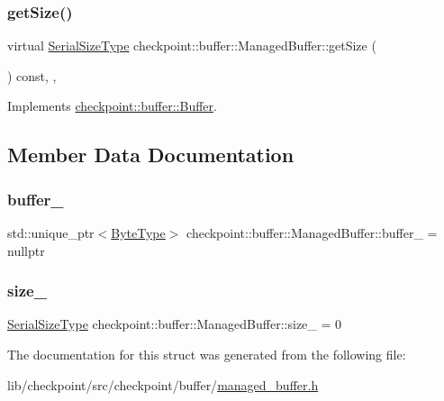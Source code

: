 \subsubsection{\texorpdfstring{get\+Size()}{getSize()}}
{\footnotesize\ttfamily virtual \hyperlink{namespacecheckpoint_a083f6674da3f94c2901b18c6d238217c}{Serial\+Size\+Type} checkpoint\+::buffer\+::\+Managed\+Buffer\+::get\+Size (\begin{DoxyParamCaption}{ }\end{DoxyParamCaption}) const\hspace{0.3cm}{\ttfamily [inline]}, {\ttfamily [override]}, {\ttfamily [virtual]}}



Implements \hyperlink{structcheckpoint_1_1buffer_1_1_buffer_a8f21655f43c4424cd88435ddebbb2d3c}{checkpoint\+::buffer\+::\+Buffer}.



\subsection{Member Data Documentation}
\mbox{\label{structcheckpoint_1_1buffer_1_1_managed_buffer_a7918a4749b6ab59e0f53ec761ee0b2e2}} 
\subsubsection{\texorpdfstring{buffer\+\_\+}{buffer\_}}
{\footnotesize\ttfamily std\+::unique\+\_\+ptr$<$\hyperlink{structcheckpoint_1_1buffer_1_1_managed_buffer_a89ff3aa4c92cd2c65973751ff4328dd5}{Byte\+Type}$>$ checkpoint\+::buffer\+::\+Managed\+Buffer\+::buffer\+\_\+ = nullptr\hspace{0.3cm}{\ttfamily [private]}}

\mbox{\label{structcheckpoint_1_1buffer_1_1_managed_buffer_a91bd6942b3e8f48c9edbcc6e1b148982}} 
\subsubsection{\texorpdfstring{size\+\_\+}{size\_}}
{\footnotesize\ttfamily \hyperlink{namespacecheckpoint_a083f6674da3f94c2901b18c6d238217c}{Serial\+Size\+Type} checkpoint\+::buffer\+::\+Managed\+Buffer\+::size\+\_\+ = 0\hspace{0.3cm}{\ttfamily [private]}}



The documentation for this struct was generated from the following file\+:\begin{DoxyCompactItemize}
\item 
lib/checkpoint/src/checkpoint/buffer/\hyperlink{managed__buffer_8h}{managed\+\_\+buffer.\+h}\end{DoxyCompactItemize}
